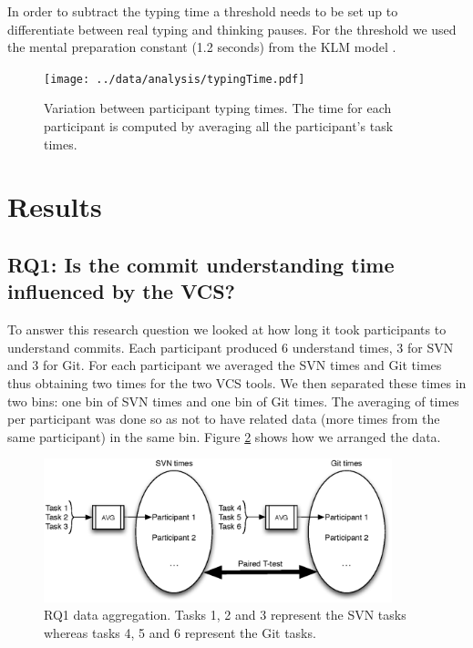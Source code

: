 \documentclass[letterpaper]{article}
\begin{document}
In order to subtract the typing time a threshold needs to be set up to differentiate between real typing and thinking pauses.
For the threshold we used the mental preparation constant (1.2 seconds) from the KLM model \cite{klm}.

\begin{figure}[H]
    \centering
    \texttt{[image: ../data/analysis/typingTime.pdf]}
    \caption{Variation between participant typing times. The time for each participant is computed by averaging all the participant's task times.}
    \label{fig:typingTimes}
\end{figure}

\section{Results}

\subsection{RQ1: Is the commit understanding time influenced by the VCS?}

To answer this research question we looked at how long it took participants to understand commits.
Each participant produced 6 understand times, 3 for SVN and 3 for Git.
For each participant we averaged the SVN times and Git times thus obtaining two times for the two VCS tools.
We then separated these times in two bins: one bin of SVN times and one bin of Git times. 
The averaging of times per participant was done so as not to have related data (more times from the same participant) in the same bin.
Figure \ref{fig:rq1-data} shows how we arranged the data.

\begin{figure}[H]
    \centering
    \includegraphics[width=0.9\textwidth]{fig/RQ1-data}
    \caption{RQ1 data aggregation. Tasks 1, 2 and 3 represent the SVN tasks whereas tasks 4, 5 and 6 represent the Git tasks.}
    \label{fig:rq1-data}
\end{figure}
\end{document}
